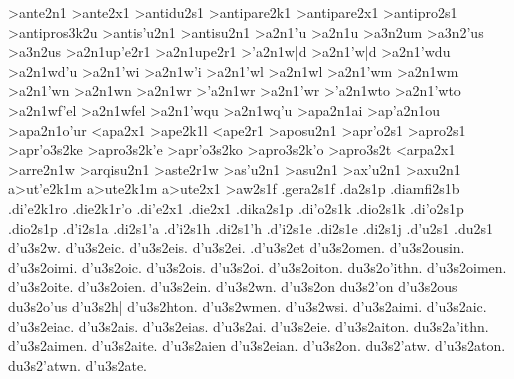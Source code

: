 {>ante2n1    		%
>ante2x1    		%
>antidu2s1  		%
>antipare2k1 		%
>antipare2x1 		%
>antipro2s1 		%
	>antipros3k2u 		%
>antis'u2n1 		%
>antisu2n1
>a2n1'u   		%
>a2n1u
	>a3n2um 		%
	>a3n2'us 		%
	>a3n2us  		%
>a2n1up'e2r1 		%
>a2n1upe2r1
>'a2n1w|d		%
>a2n1'w|d
>a2n1'wdu  	%
>a2n1wd'u %
>a2n1'wi    		%
>a2n1w'i
>a2n1'wl     		%
>a2n1wl
>a2n1'wm 		%
>a2n1wm
>a2n1'wn 		%
>a2n1wn
>a2n1wr  		%
>'a2n1wr 		%
>a2n1'wr
>'a2n1wto 		%
>a2n1'wto
>a2n1wf'el  		%
>a2n1wfel   		%
>a2n1'wqu 		%
>a2n1wq'u
>apa2n1ai 		%
>ap'a2n1ou 		%
>apa2n1o'ur
<apa2x1       		%
>ape2k1l 		%
<ape2r1      		%
>aposu2n1 		%
>apr'o2s1 		%
>apro2s1
	>apr'o3s2ke 		%
	>apro3s2k'e
	>apr'o3s2ko 		%
	>apro3s2k'o
	>apro3s2t 		%
<arpa2x1 		%
>arre2n1w 		%
>arqisu2n1 		%
>aste2r1w    		%
>as'u2n1     		%
>asu2n1
>ax'u2n1  		%
>axu2n1 
a>ut'e2k1m 		%
a>ute2k1m
a>ute2x1   		%
>aw2s1f    		%
.gera2s1f  		%
.da2s1p    		%
.diamfi2s1b 		%
.di'e2k1ro 		%
.die2k1r'o
.di'e2x1   		%
.die2x1    		%
.dika2s1p  		%
.di'o2s1k  		%
.dio2s1k
.di'o2s1p		%
.dio2s1p
.d'i2s1a       		%
.di2s1'a
.d'i2s1h   		%
.di2s1'h
.d'i2s1e   		%
.di2s1e
.di2s1j    		%
.d'u2s1    		%
.du2s1
%
	d'u3s2w.  		%
	d'u3s2eic.
	d'u3s2eis.
	d'u3s2ei.
	.d'u3s2et
	d'u3s2omen.
	d'u3s2ousin.
	d'u3s2oimi.
	d'u3s2oic.
	d'u3s2ois.
	d'u3s2oi.
	d'u3s2oiton.
	du3s2o'ithn.
	d'u3s2oimen.
	d'u3s2oite.
	d'u3s2oien.
	d'u3s2ein.
	d'u3s2wn. d'u3s2on du3s2'on  
	d'u3s2ous du3s2o'us
	d'u3s2h|
	d'u3s2hton.
	d'u3s2wmen.
	d'u3s2wsi.
	d'u3s2aimi.
	d'u3s2aic. d'u3s2eiac.
	d'u3s2ais. d'u3s2eias.
	d'u3s2ai. d'u3s2eie.
	d'u3s2aiton.
	du3s2a'ithn.
	d'u3s2aimen.
	d'u3s2aite.
	d'u3s2aien d'u3s2eian.
	d'u3s2on.
	du3s2'atw.
	d'u3s2aton.
	du3s2'atwn.
	d'u3s2ate.
}
